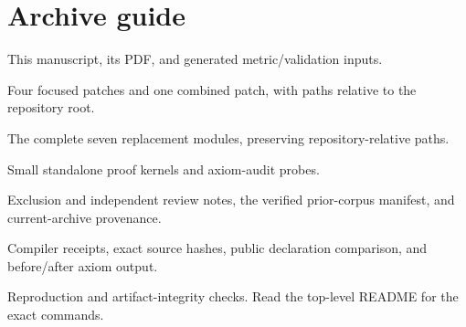 \documentclass[11pt,letterpaper]{article}
\newcommand{\code}[1]{\nolinkurl{#1}}
\begin{document}
\section{Archive guide}
\begin{description}[leftmargin=1.6em,style=nextline]
\item[\code{report/}] This manuscript, its PDF, and generated metric/validation inputs.
\item[\code{patches/}] Four focused patches and one combined patch, with paths relative to the repository root.
\item[\code{overlay/}] The complete seven replacement modules, preserving repository-relative paths.
\item[\code{lean/}] Small standalone proof kernels and axiom-audit probes.
\item[\code{audit/}] Exclusion and independent review notes, the verified prior-corpus manifest, and current-archive provenance.
\item[\code{evidence/}] Compiler receipts, exact source hashes, public declaration comparison, and before/after axiom output.
\item[\code{scripts/}] Reproduction and artifact-integrity checks. Read the top-level README for the exact commands.
\end{description}
\end{document}
